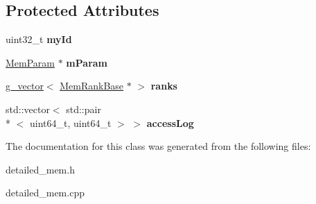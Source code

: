 \subsection*{Protected Attributes}
\begin{DoxyCompactItemize}
\item 
\hypertarget{classMemChannelBase_a7a8fb00f3696fe94d0481cae51ac465d}{uint32\-\_\-t {\bfseries my\-Id}}\label{classMemChannelBase_a7a8fb00f3696fe94d0481cae51ac465d}

\item 
\hypertarget{classMemChannelBase_ad7f8f8563be92ce36d94dbccf7ef1087}{\hyperlink{classMemParam}{Mem\-Param} $\ast$ {\bfseries m\-Param}}\label{classMemChannelBase_ad7f8f8563be92ce36d94dbccf7ef1087}

\item 
\hypertarget{classMemChannelBase_aaf66ca50858e84f178b4c8bd33906950}{\hyperlink{classg__vector}{g\-\_\-vector}$<$ \hyperlink{classMemRankBase}{Mem\-Rank\-Base} $\ast$ $>$ {\bfseries ranks}}\label{classMemChannelBase_aaf66ca50858e84f178b4c8bd33906950}

\item 
\hypertarget{classMemChannelBase_ac8d24b0f4f6f2aa7c0cb5f28e192f39d}{std\-::vector$<$ std\-::pair\\*
$<$ uint64\-\_\-t, uint64\-\_\-t $>$ $>$ {\bfseries access\-Log}}\label{classMemChannelBase_ac8d24b0f4f6f2aa7c0cb5f28e192f39d}

\end{DoxyCompactItemize}


The documentation for this class was generated from the following files\-:\begin{DoxyCompactItemize}
\item 
detailed\-\_\-mem.\-h\item 
detailed\-\_\-mem.\-cpp\end{DoxyCompactItemize}
